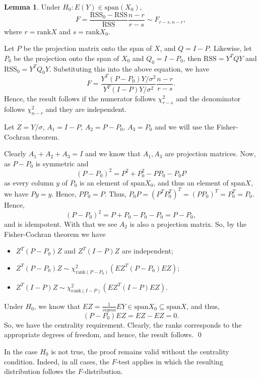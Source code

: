 \documentclass[
]{article}
\theoremstyle{definition}
\theoremstyle{definition}
\newtheorem{lemma}{Lemma}[section]
\begin{document}
\begin{lemma}
  Under \(H_0 : E(Y) \in \text{span}(X_0)\), 
  \[F = \frac{\text{RSS}_0 - \text{RSS}}{\text{RSS}} \frac{n - r}{r - s} \sim F_{r - s, n - r},\]
  where \(r = \text{rank} X\) and \(s = \text{rank} X_0\).
\end{lemma}

Let \(P\) be the projection matrix onto the span of \(X\), and
\(Q = I - P\). Likewise, let \(P_0\) be the projection onto the span of
\(X_0\) and \(Q_0 = I - P_0\), then \(\text{RSS} = Y^T Q Y\) and
\(\text{RSS}_0 = Y^T Q_0 Y\). Substituting this into the above equation,
we have
\[F = \frac{Y^T(P - P_0) Y / \sigma^2}{Y^T(I - P) Y / \sigma^2} \frac{n - r}{r - s}.\]
Hence, the result follows if the numerator follows \(\chi_{r - s}^2\)
and the denominator follows \(\chi_{n - r}^2\) and they are independent.

\proof

Let \(Z = Y / \sigma\), \(A_1 = I - P\), \(A_2 = P - P_0\),
\(A_3 = P_0\) and we will use the Fisher-Cochran theorem.

Clearly \(A_1 + A_2 + A_3 = I\) and we know that \(A_1, A_3\) are
projection matrices. Now, as \(P - P_0\) is symmetric and
\[(P - P_0)^2 = P^2 + P_0^2 - PP_0 - P_0P\] as every column \(y\) of
\(P_0\) is an element of \(\text{span} X_0\), and thus an element of
\(\text{span} X\), we have \(P y = y\). Hence, \(P P_0 = P\). Thus,
\(P_0 P = (P^T P_0^T)^T = (PP_0)^T = P_0^T = P_0\). Hence,
\[(P - P_0)^2 = P + P_0 - P_0 - P_0 = P - P_0,\] and is idempotent. With
that we see \(A_2\) is also a projection matrix. So, by the
Fisher-Cochran theorem we have

\begin{itemize}
    \item \(Z^T(P - P_0)Z\) and \(Z^T(I - P) Z\) are independent;
    \item \(Z^T(P - P_0)Z \sim \chi_{\text{rank}(P - P_0)}^2(EZ^T(P - P_0)EZ)\);
    \item \(Z^T(I - P)Z \sim \chi_{\text{rank}(I - P)}^2(EZ^T(I - P)EZ)\).
  \end{itemize}

Under \(H_0\), we know that
\(EZ = \frac{1}{sigma} EY \in \text{span}X_0 \subseteq \text{span}X\),
and thus, \[(P - P_0) EZ = EZ - EZ = 0.\] So, we have the centrality
requirement. Clearly, the ranks corresponds to the appropriate degrees
of freedom, and hence, the result follows. \qed

In the case \(H_0\) is not true, the proof remains valid without the
centrality condition. Indeed, in all cases, the \(F\)-test applies in
which the resulting distribution follows the \(F\)-distribution.
\end{document}
